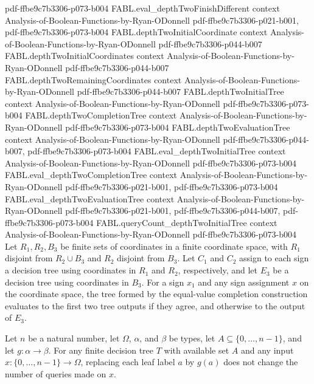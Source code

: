 \begin{theorem}
  {pdf-ffbe9c7b3306-p073-b004}
\proofstep
  {FABL.eval_depthTwoFinishDifferent}
  {context}
  {Analysis-of-Boolean-Functions-by-Ryan-ODonnell}
  {pdf-ffbe9c7b3306-p021-b001,
    pdf-ffbe9c7b3306-p073-b004}
\proofstep
  {FABL.depthTwoInitialCoordinate}
  {context}
  {Analysis-of-Boolean-Functions-by-Ryan-ODonnell}
  {pdf-ffbe9c7b3306-p044-b007}
\proofstep
  {FABL.depthTwoInitialCoordinates}
  {context}
  {Analysis-of-Boolean-Functions-by-Ryan-ODonnell}
  {pdf-ffbe9c7b3306-p044-b007}
\proofstep
  {FABL.depthTwoRemainingCoordinates}
  {context}
  {Analysis-of-Boolean-Functions-by-Ryan-ODonnell}
  {pdf-ffbe9c7b3306-p044-b007}
\proofstep
  {FABL.depthTwoInitialTree}
  {context}
  {Analysis-of-Boolean-Functions-by-Ryan-ODonnell}
  {pdf-ffbe9c7b3306-p073-b004}
\proofstep
  {FABL.depthTwoCompletionTree}
  {context}
  {Analysis-of-Boolean-Functions-by-Ryan-ODonnell}
  {pdf-ffbe9c7b3306-p073-b004}
\proofstep
  {FABL.depthTwoEvaluationTree}
  {context}
  {Analysis-of-Boolean-Functions-by-Ryan-ODonnell}
  {pdf-ffbe9c7b3306-p044-b007,
    pdf-ffbe9c7b3306-p073-b004}
\proofstep
  {FABL.eval_depthTwoInitialTree}
  {context}
  {Analysis-of-Boolean-Functions-by-Ryan-ODonnell}
  {pdf-ffbe9c7b3306-p073-b004}
\proofstep
  {FABL.eval_depthTwoCompletionTree}
  {context}
  {Analysis-of-Boolean-Functions-by-Ryan-ODonnell}
  {pdf-ffbe9c7b3306-p021-b001,
    pdf-ffbe9c7b3306-p073-b004}
\proofstep
  {FABL.eval_depthTwoEvaluationTree}
  {context}
  {Analysis-of-Boolean-Functions-by-Ryan-ODonnell}
  {pdf-ffbe9c7b3306-p021-b001,
    pdf-ffbe9c7b3306-p044-b007,
    pdf-ffbe9c7b3306-p073-b004}
\proofstep
  {FABL.queryCount_depthTwoInitialTree}
  {context}
  {Analysis-of-Boolean-Functions-by-Ryan-ODonnell}
  {pdf-ffbe9c7b3306-p073-b004}
Let $R_1,R_2,B_3$ be finite sets of coordinates in a finite coordinate space, with $R_1$
disjoint from $R_2\cup B_3$ and $R_2$ disjoint from $B_3$. Let $C_1$ and $C_2$ assign to
each sign a decision tree using coordinates in $R_1$ and $R_2$, respectively, and let
$E_3$ be a decision tree using coordinates in $B_3$. For a sign $x_1$ and any sign
assignment $x$ on the coordinate space, the tree formed by the equal-value completion
construction evaluates to the first two tree outputs if they agree, and otherwise to the
output of $E_3$.
\end{theorem}

\begin{theorem}
\label{FABL.FiniteDecisionTree.queryCount_mapOutput}
\leanok
{}
Let $n$ be a natural number, let $\Omega$, $\alpha$, and $\beta$ be types, let
$A\subseteq\{0,\ldots,n-1\}$, and let $g:\alpha\to\beta$. For any finite decision tree
$T$ with available set $A$ and any input $x:\{0,\ldots,n-1\}\to\Omega$, replacing each
leaf label $a$ by $g(a)$ does not change the number of queries made on $x$.
\end{theorem}

